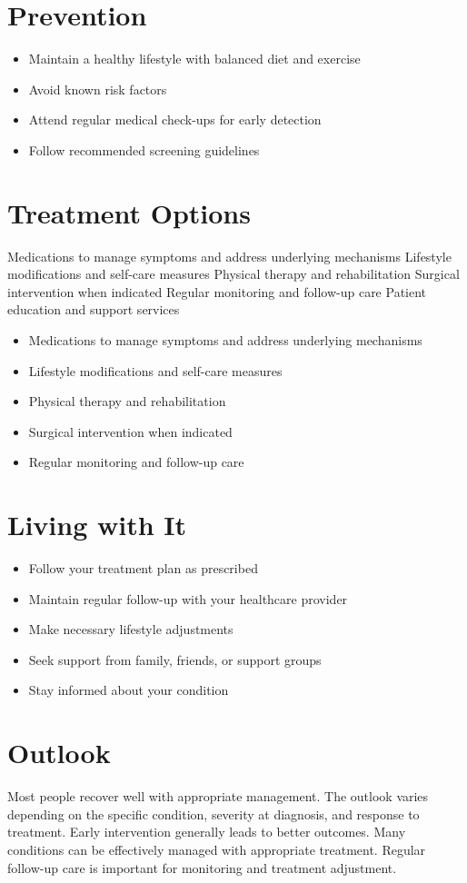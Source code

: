 \section{Prevention}
\begin{itemize}[noitemsep]
  \item Maintain a healthy lifestyle with balanced diet and exercise
  \item Avoid known risk factors
  \item Attend regular medical check-ups for early detection
  \item Follow recommended screening guidelines
\end{itemize}
\section{Treatment Options}
Medications to manage symptoms and address underlying mechanisms Lifestyle modifications and self-care measures Physical therapy and rehabilitation Surgical intervention when indicated Regular monitoring and follow-up care Patient education and support services

\begin{itemize}[noitemsep]
  \item Medications to manage symptoms and address underlying mechanisms
  \item Lifestyle modifications and self-care measures
  \item Physical therapy and rehabilitation
  \item Surgical intervention when indicated
  \item Regular monitoring and follow-up care
\end{itemize}
\section{Living with It}
\begin{itemize}[noitemsep]
  \item Follow your treatment plan as prescribed
  \item Maintain regular follow-up with your healthcare provider
  \item Make necessary lifestyle adjustments
  \item Seek support from family, friends, or support groups
  \item Stay informed about your condition
\end{itemize}
\section{Outlook}
Most people recover well with appropriate management. The outlook varies depending on the specific condition, severity at diagnosis, and response to treatment. Early intervention generally leads to better outcomes. Many conditions can be effectively managed with appropriate treatment. Regular follow-up care is important for monitoring and treatment adjustment.
